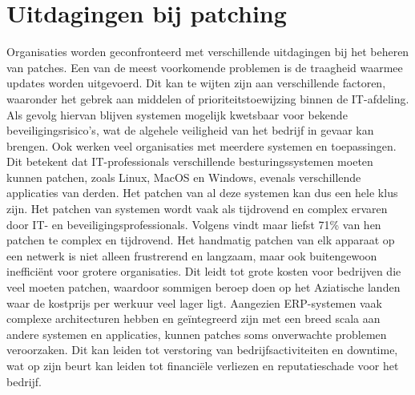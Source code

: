 \section{Uitdagingen bij patching}
Organisaties worden geconfronteerd met verschillende uitdagingen bij het beheren van patches. Een van de meest voorkomende problemen is de traagheid waarmee updates worden uitgevoerd. Dit kan te wijten zijn aan verschillende factoren, waaronder het gebrek aan middelen of prioriteitstoewijzing binnen de IT-afdeling. Als gevolg hiervan blijven systemen mogelijk kwetsbaar voor bekende beveiligingsrisico's, wat de algehele veiligheid van het bedrijf in gevaar kan brengen. \autocite{AppMaster2023}
Ook werken veel organisaties met meerdere systemen en toepassingen. Dit betekent dat IT-professionals verschillende besturingssystemen moeten kunnen patchen, zoals Linux, MacOS en Windows, evenals verschillende applicaties van derden. Het patchen van al deze systemen kan dus een hele klus zijn.
Het patchen van systemen wordt vaak als tijdrovend en complex ervaren door IT- en beveiligingsprofessionals. Volgens \textcite{ivanti2021} vindt maar liefst 71\% van hen patchen te complex en tijdrovend. Het handmatig patchen van elk apparaat op een netwerk is niet alleen frustrerend en langzaam, maar ook buitengewoon inefficiënt voor grotere organisaties. Dit leidt tot grote kosten voor bedrijven die veel moeten patchen, waardoor sommigen beroep doen op het Aziatische landen waar de kostprijs per werkuur veel lager ligt. 
Aangezien ERP-systemen vaak complexe architecturen hebben en geïntegreerd zijn met een breed scala aan andere systemen en applicaties, kunnen patches soms onverwachte problemen veroorzaken. Dit kan leiden tot verstoring van bedrijfsactiviteiten en downtime, wat op zijn beurt kan leiden tot financiële verliezen en reputatieschade voor het bedrijf.
	
